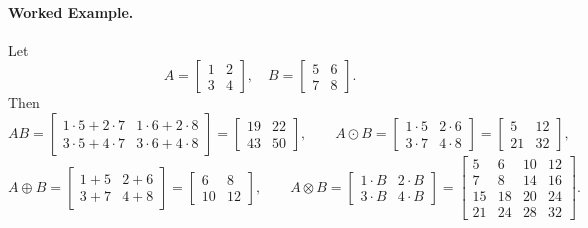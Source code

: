 \documentclass[11pt]{article}
\theoremstyle{remark}
\begin{document}
\paragraph{Worked Example.}
Let
\[
A = \begin{bmatrix}1 & 2 \\ 3 & 4\end{bmatrix},
\quad
B = \begin{bmatrix}5 & 6 \\ 7 & 8\end{bmatrix}.
\]
Then
\[
AB =
\begin{bmatrix}
1\cdot 5 + 2\cdot 7 & 1\cdot 6 + 2\cdot 8 \\
3\cdot 5 + 4\cdot 7 & 3\cdot 6 + 4\cdot 8
\end{bmatrix}
=
\begin{bmatrix}
19 & 22 \\
43 & 50
\end{bmatrix},
\qquad
A \odot B =
\begin{bmatrix}
1\cdot 5 & 2\cdot 6 \\
3\cdot 7 & 4\cdot 8
\end{bmatrix}
=
\begin{bmatrix}
5 & 12 \\
21 & 32
\end{bmatrix},
\]
\[
A \oplus B =
\begin{bmatrix}
1+5 & 2+6 \\
3+7 & 4+8
\end{bmatrix}
=
\begin{bmatrix}
6 & 8 \\
10 & 12
\end{bmatrix},
\qquad
A \otimes B =
\begin{bmatrix}
1\cdot B & 2\cdot B \\
3\cdot B & 4\cdot B
\end{bmatrix}
=
\begin{bmatrix}
5 & 6 & 10 & 12 \\
7 & 8 & 14 & 16 \\
15 & 18 & 20 & 24 \\
21 & 24 & 28 & 32
\end{bmatrix}.
\]
\end{document}

